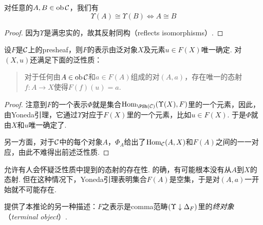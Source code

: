   \begin{cor}
    对任意的$A,B\in\operatorname{ob}{\cal C}$，我们有
    \begin{equation*}
      \Upsilon(A)\cong\Upsilon(B)\iff A\cong B
    \end{equation*}
  \end{cor}
  \begin{proof}
    因为$\Upsilon$是满忠实的，故其反射同构（reflects isomorphisms）.
  \end{proof}

  \begin{cor}
    设$F$是${\cal C}$上的presheaf，则$F$的表示由泛对象$X$及元素$u\in F(X)$唯一确定. 对$(X,u)$还满足下面的泛性质：
    \begin{quote}
      对于任何由$A\in\operatorname{ob}{\cal C}$和$a\in F(A)$组成的对$(A,a)$，存在唯一的态射$f\colon A\to X$使得$F(f)(u)=a$.
    \end{quote}
  \end{cor}
  \begin{proof}
    注意到$F$的一个表示$\Phi$就是集合$\Hom_{\PSh(\Cc)}(\Upsilon(X),F)$里的一个元素，因此，由Yoneda引理，它通过$\Upsilon$对应于$F(X)$里的一个元素，比如$u\in F(X)$. 于是$\Phi$就由$X$和$u$唯一确定了.

    另一方面，对于${\cal C}$中的每个对象$A$，$\Phi_{A}$给出了$\operatorname{Hom}_{{\cal C}}(A,X)$和$F(A)$之间的一一对应，由此不难得出前述泛性质.
  \end{proof}
  \begin{rem}
    允许有人会怀疑泛性质中提到的态射的存在性. 的确，有可能根本没有从$A$到$X$的态射. 但在这种情况下，Yoneda引理表明集合$F(A)$是空集，于是对$(A,a)$一开始就不可能存在.
  \end{rem}
  \begin{rem}
     \nlab 提供了本推论的另一种描述：$F$之表示是comma范畴$(\Upsilon\downarrow\Delta_{F})$里的\emph{终对象}（\emph{terminal object}）.
  \end{rem}

